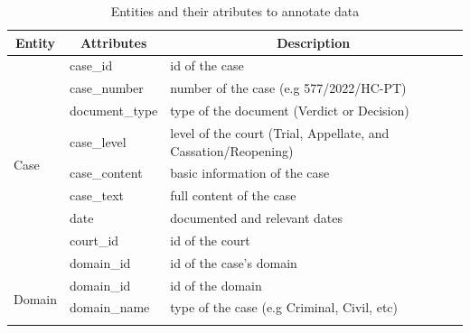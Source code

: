 \documentclass[conference]{IEEEtran}
\begin{document}
\begin{table}[ht]
\caption{Entities and their atributes to annotate data}
\label{tab:entity}
\begin{tabular}{|p{1cm}|p{2cm}|p{4.5cm}|}
\hline
\multicolumn{1}{|c|}{\textbf{Entity}} & \multicolumn{1}{c|}{\textbf{Attributes}} & \multicolumn{1}{c|}{\textbf{Description}}                      \\ \hline
\multirow{9}{*}{Case}                 & case\_id                                 & id of the case                                                 \\ \cline{2-3} 
                                      & case\_number                             & number of the case (e.g 577/2022/HC-PT)                         \\ \cline{2-3} 
                                      & document\_type                           & type of the document (Verdict or Decision)                     \\ \cline{2-3} 
                                      & case\_level                              & level of the court (Trial, Appellate, and Cassation/Reopening) \\ \cline{2-3} 
                                      & case\_content                            & basic information of the case                                  \\ \cline{2-3} 
                                      & case\_text                               & full content of the case                                       \\ \cline{2-3} 
                                      & date                                     & documented and relevant dates                                  \\ \cline{2-3} 
                                      & court\_id                                & id of the court                                                \\ \cline{2-3} 
                                      & domain\_id                               & id of the case's domain                                    \\ \hline
\multirow{3}{*}{Domain}               & domain\_id                               & id of the domain                                               \\ \cline{2-3} 
                                      & domain\_name                             & type of the case (e.g Criminal, Civil, etc)                \\ \cline{2-3} 

\end{tabular}
\end{table}
\end{document}
